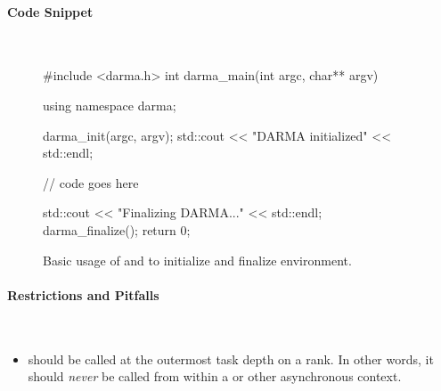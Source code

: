 \paragraph{Code Snippet}\mbox{} \\
\begin{figure}[!h]
\begin{CppCodeNumb}
#include <darma.h>
int darma_main(int argc, char** argv)
{
  using namespace darma;

  darma_init(argc, argv);
  std::cout << "DARMA initialized" << std::endl;

  // code goes here

  std::cout << "Finalizing DARMA..." << std::endl;
  darma_finalize();
  return 0;
}
\end{CppCodeNumb}
\caption{Basic usage of \protect{} and \protect{} 
to initialize and finalize environment.}
\label{fig:fe_api_init}
\end{figure}

\paragraph{Restrictions and Pitfalls}\mbox{} \\
\begin{itemize}
  \item {} should be called at the outermost \gls{task} depth on
    a \gls{rank}.  In other words, it should {\it never} be called from within a
     or other asynchronous context.
\end{itemize}




